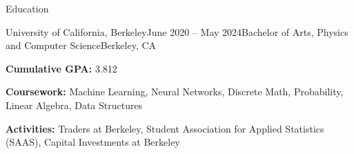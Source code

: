 \documentclass{resume} %
\begin{document}

\begin{rSection}{Education}
    \begin{rSubsection}{University of California, Berkeley}{June 2020 – May 2024}{Bachelor of Arts, Physics and Computer Science}{Berkeley, CA}
        \item {\bf Cumulative GPA:} 3.812
        \item {\bf Coursework:} Machine Learning, Neural Networks, Discrete Math, Probability, Linear Algebra, Data Structures
        \item {\bf Activities:} Traders at Berkeley, Student Association for Applied Statistics (SAAS), Capital Investments at Berkeley
        \end{rSubsection}
    \end{rSection}

\end{document}
